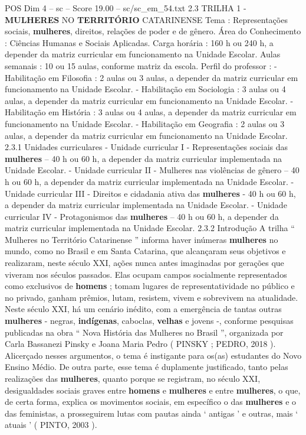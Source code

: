 \begin{textsample}{POS Dim 4 – sc – Score 19.00 – sc/sc\_em\_54.txt}  \label{ex:f4_pos_035}
2.3 TRILHA 1 - \textbf{MULHERES} NO \textbf{TERRITÓRIO} CATARINENSE Tema : Representações sociais, \textbf{mulheres}, direitos, relações de poder e de gênero.
Área do Conhecimento : Ciências Humanas e Sociais Aplicadas.
Carga horária : 160 h ou 240 h, a depender da matriz curricular em funcionamento na Unidade Escolar.
Aulas semanais : 10 ou 15 aulas, conforme matriz da escola.
Perfil do professor : - Habilitação em Filosofia : 2 aulas ou 3 aulas, a depender da matriz curricular em funcionamento na Unidade Escolar. - Habilitação em Sociologia : 3 aulas ou 4 aulas, a depender da matriz curricular em funcionamento na Unidade Escolar. - Habilitação em História : 3 aulas ou 4 aulas, a depender da matriz curricular em funcionamento na Unidade Escolar. - Habilitação em Geografia : 2 aulas ou 3 aulas, a depender da matriz curricular em funcionamento na Unidade Escolar. 2.3.1 Unidades curriculares - Unidade curricular I - Representações sociais das \textbf{mulheres} – 40 h ou 60 h, a depender da matriz curricular implementada na Unidade Escolar. - Unidade curricular II - Mulheres nas violências de gênero – 40 h ou 60 h, a depender da matriz curricular implementada na Unidade Escolar. - Unidade curricular III - Direitos e cidadania ativa das \textbf{mulheres} - 40 h ou 60 h, a depender da matriz curricular implementada na Unidade Escolar. - Unidade curricular IV - Protagonismos das \textbf{mulheres} – 40 h ou 60 h, a depender da matriz curricular implementada na Unidade Escolar. 2.3.2 Introdução A trilha “ Mulheres no Território Catarinense ” informa haver inúmeras \textbf{mulheres} no mundo, como no Brasil e em Santa Catarina, que alcançaram seus objetivos e realizaram, neste século XXI, ações nunca antes imaginadas por gerações que viveram nos séculos passados.
Elas ocupam campos socialmente representados como exclusivos de \textbf{homens} ; tomam lugares de representatividade no público e no privado, ganham prêmios, lutam, resistem, vivem e sobrevivem na atualidade.
Neste século XXI, há um cenário inédito, com a emergência de tantas outras \textbf{mulheres} - negras, \textbf{indígenas}, caboclas, \textbf{velhas} e jovens -, conforme pesquisas publicadas na obra “ Nova História das Mulheres no Brasil ”, organizada por Carla Bassanezi Pinsky e Joana Maria Pedro ( PINSKY ; PEDRO, 2018 ).
Alicerçado nesses argumentos, o tema é instigante para os(as) estudantes do Novo Ensino Médio.
De outra parte, esse tema é duplamente justificado, tanto pelas realizações das \textbf{mulheres}, quanto porque se registram, no século XXI, desigualdades sociais graves entre \textbf{homens} e \textbf{mulheres} e entre \textbf{mulheres}, o que, de certa forma, explica os movimentos sociais, em específico o das \textbf{mulheres} e o das feministas, a prosseguirem lutas com pautas ainda ‘ antigas ’ e outras, mais ‘ atuais ’ ( PINTO, 2003 ).

\end{textsample}
